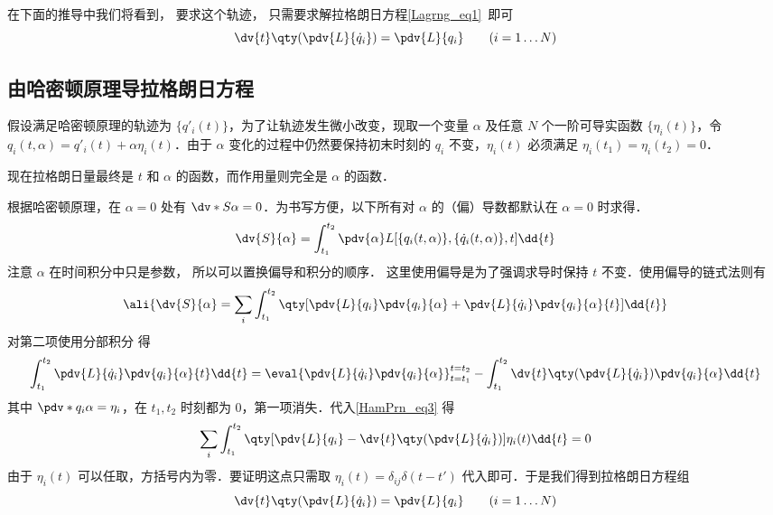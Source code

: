 在下面的推导中我们将看到， 要求这个轨迹， 只需要求解拉格朗日方程\autoref{Lagrng_eq1}~即可
\begin{equation}\label{HamPrn_eq4}
\dv{t} \qty(\pdv{L}{\dot q_i}) = \pdv{L}{q_i} \qquad
(i = 1\dots N)
\end{equation}

\subsection{由哈密顿原理导拉格朗日方程}

假设满足哈密顿原理的轨迹为 $\{q'_i(t)\}$，为了让轨迹发生微小改变，现取一个变量 $\alpha$ 及任意 $N$ 个一阶可导实函数 $\{\eta_i(t)\}$，令 $q_i(t,\alpha ) = q'_i(t) + \alpha \eta_i(t)$．由于 $\alpha$ 变化的过程中仍然要保持初末时刻的 $q_i$ 不变，$\eta_i(t)$ 必须满足 $\eta_i(t_1) = \eta_i(t_2) = 0$．

现在拉格朗日量最终是 $t$ 和 $\alpha$ 的函数，而作用量则完全是 $\alpha$ 的函数．
 
根据哈密顿原理，在 $\alpha = 0$ 处有 $\dv*{S}{\alpha} = 0$．为书写方便，以下所有对 $\alpha$ 的（偏）导数都默认在 $\alpha=0$ 时求得．
\begin{equation}
\dv{S}{\alpha} = \int_{t_1}^{t_2} \pdv{\alpha} L[\{q_i(t,\alpha )\}, \{\dot q_i(t,\alpha)\}, t] \dd{t}
\end{equation}
注意 $\alpha$ 在时间积分中只是参数， 所以可以置换偏导和积分的顺序． %
这里使用偏导是为了强调求导时保持 $t$ 不变．使用偏导的链式法则有
\begin{equation}\label{HamPrn_eq3}
\ali{
\dv{S}{\alpha} =
\sum_i \int_{t_1}^{t_2} \qty[\pdv{L}{q_i} \pdv{q_i}{\alpha} + \pdv{L}{\dot q_i}\pdv{q_i}{\alpha}{t}] \dd{t}
}\end{equation}
对第二项使用分部积分 得
\begin{equation}
\int_{t_1}^{t_2} \pdv{L}{\dot q_i} \pdv{q_i}{\alpha}{t} \dd{t}  = \eval{\pdv{L}{\dot q_i}\pdv{q_i}{\alpha}}_{t = t_1}^{t = t_2} - \int_{t_1}^{t_2} \dv{t} \qty(\pdv{L}{\dot q_i})\pdv{q_i}{\alpha} \dd{t}
\end{equation}
其中 $\pdv*{q_i}{\alpha}  = \eta_i$，在 $t_1, t_2$ 时刻都为 0，第一项消失．代入\autoref{HamPrn_eq3} 得
\begin{equation}
\sum_i \int_{t_1}^{t_2} \qty[\pdv{L}{q_i} - \dv{t} \qty(\pdv{L}{\dot q_i})] \eta_i(t) \dd{t} = 0
\end{equation}
由于 $\eta_i(t)$ 可以任取，方括号内为零．要证明这点只需取 $\eta_i(t) = \delta_{ij}\delta(t - t')$ 代入即可．于是我们得到拉格朗日方程组
\begin{equation}\label{HamPrn_eq2}
\dv{t} \qty(\pdv{L}{\dot q_i}) = \pdv{L}{q_i} \qquad
(i = 1\dots N)
\end{equation}
